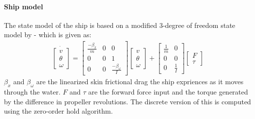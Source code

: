 \documentclass[a0,portrait]{a0poster}
\begin{document}
\begin{center}
{\paragraph{Ship model}
The state model of the ship is based on a modified 3-degree of freedom state model by \cite{sorensen} - which is given as: 
\begin{align}
\dot{\begin{bmatrix}
v\\
\theta\\
\omega
\end{bmatrix}} = \begin{bmatrix}
\frac{-\beta_x}{m} & 0 & 0\\
0 & 0 & 1\\
0 & 0 & \frac{-\beta_\omega}{I}
\end{bmatrix}\begin{bmatrix}
v\\
\theta\\
\omega
\end{bmatrix} + \begin{bmatrix}
\frac{1}{m} & 0\\
0 & 0\\
0 & \frac{1}{I}
\end{bmatrix}\begin{bmatrix}
F\\
\tau
\end{bmatrix}
\end{align}
$\beta_x$ and $\beta_\omega$ are the linearized skin frictional drag the ship expriences as it moves through the water. $F$ and $\tau$ are the forward force input and the torque generated by the difference in propeller revolutions. The discrete version of this is computed using the zero-order hold algorithm.

}
\end{center}
\end{document}
